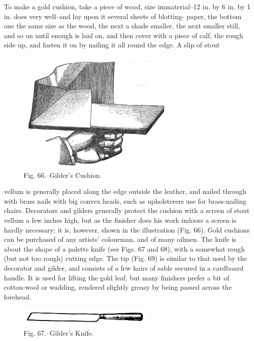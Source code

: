 \documentclass[twoside]{book}
\begin{document}
To make a gold cushion, take a piece of wood,
size immaterial--12 in. by 6 in. by 1 in. does very
well--and lay upon it several sheets of blotting-
paper, the bottom one the same size as the wood,
the next a shade smaller, the next smaller still, and
so on until enough is laid on, and then cover with
a piece of calf, the rough side up, and fasten it on
by nailing it all round the edge. A slip of stout
	\begin{figure}[h]
		\centering
		\includegraphics[width=0.7\textwidth]{Figures/_066.png}
		\caption*{Fig. 66.--Gilder's Cushion.}
	\end{figure}
vellum is generally placed along the edge outside
the leather, and nailed through with brass nails
with big convex heads, such as upholsterers use for
brass-nailing chairs. Decorators and gilders generally
protect the cushion with a screen of stout
vellum a few inches high, but as the finisher does
his work indoors a screen is hardly necessary; it
is, however, shown in the illustration (Fig. 66).
Gold cushions can be purchased of any artists'
colourman, and of many oilmen. The knife is about
\pagebreak
the shape of a palette knife (see Figs. 67 and 68),
with a somewhat rough (but not too rough) cutting edge.
The tip (Fig. 69) is similar to that used by the
decorator and gilder, and consists of a few hairs
of sable secured in a cardboard handle. It is
used for lifting the gold leaf, but many finishers
prefer a bit of cotton-wool or wadding, rendered
slightly greasy by being passed across the forehead.

	\begin{figure}[h]
		\centering
		\includegraphics[width=0.6\textwidth]{Figures/_067.png}
		\caption*{Fig. 67.--Gilder's Knife.}
	\end{figure}
\end{document}
